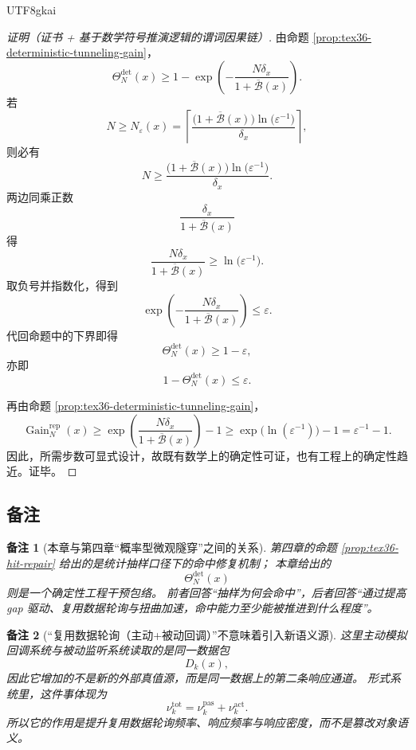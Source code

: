 \documentclass[12pt]{article}
\newtheorem{remark}{备注}[section]
\begin{document}
\begin{CJK*}{UTF8}{gkai}
\begin{proof}[证明（证书 + 基于数学符号推演逻辑的谓词因果链）]
由命题 \ref{prop:tex36-deterministic-tunneling-gain}，
\[
  \Theta_N^{\mathrm{det}}(x)
  \ge
  1-\exp\left(
    -\frac{N\delta_x}{1+\overline{\mathcal B}(x)}
  \right).
\]
若
\[
  N\ge N_\varepsilon(x)
  =
  \left\lceil
    \frac{
      \bigl(1+\overline{\mathcal B}(x)\bigr)\ln\!\bigl(\varepsilon^{-1}\bigr)
    }{
      \delta_x
    }
  \right\rceil,
\]
则必有
\[
  N
  \ge
  \frac{
    \bigl(1+\overline{\mathcal B}(x)\bigr)\ln\!\bigl(\varepsilon^{-1}\bigr)
  }{
    \delta_x
  }.
\]
两边同乘正数
\[
  \frac{\delta_x}{1+\overline{\mathcal B}(x)}
\]
得
\[
  \frac{N\delta_x}{1+\overline{\mathcal B}(x)}
  \ge
  \ln\!\bigl(\varepsilon^{-1}\bigr).
\]
取负号并指数化，得到
\[
  \exp\left(
    -\frac{N\delta_x}{1+\overline{\mathcal B}(x)}
  \right)
  \le
  \varepsilon.
\]
代回命题中的下界即得
\[
  \Theta_N^{\mathrm{det}}(x)\ge 1-\varepsilon,
\]
亦即
\[
  1-\Theta_N^{\mathrm{det}}(x)\le \varepsilon.
\]

再由命题 \ref{prop:tex36-deterministic-tunneling-gain}，
\[
  \operatorname{Gain}_N^{\mathrm{rep}}(x)
  \ge
  \exp\left(
    \frac{N\delta_x}{1+\overline{\mathcal B}(x)}
  \right)-1
  \ge
  \exp\bigl(\ln(\varepsilon^{-1})\bigr)-1
  =
  \varepsilon^{-1}-1.
\]
因此，所需步数可显式设计，故既有数学上的确定性可证，也有工程上的确定性趋近。证毕。
\end{proof}

\subsection{备注}
\label{subsec:tex36-ch7-remarks}

\begin{remark}[本章与第四章“概率型微观隧穿”之间的关系]
第四章的命题 \ref{prop:tex36-hit-repair} 给出的是统计抽样口径下的命中修复机制；
本章给出的
\[
  \Theta_N^{\mathrm{det}}(x)
\]
则是一个确定性工程干预包络。
前者回答“抽样为何会命中”，后者回答“通过提高 gap 驱动、复用数据轮询与扭曲加速，命中能力至少能被推进到什么程度”。
\end{remark}

\begin{remark}[“复用数据轮询（主动+被动回调）”不意味着引入新语义源]
这里主动模拟回调系统与被动监听系统读取的是同一数据包
\[
  D_k(x),
\]
因此它增加的不是新的外部真值源，而是同一数据上的第二条响应通道。
形式系统里，这件事体现为
\[
  \nu_k^{\mathrm{tot}}
  =
  \nu_k^{\mathrm{pas}}
  +
  \nu_k^{\mathrm{act}}.
\]
所以它的作用是提升复用数据轮询频率、响应频率与响应密度，而不是篡改对象语义。
\end{remark}


\end{CJK*}
\end{document}
